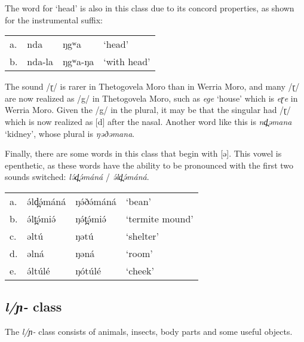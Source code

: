 The word for ‘head’ is also in this class due to its concord properties, as shown for the instrumental suffix:

\ea	
\begin{tabular}[t]{llll}
a.	&	nda		&	ŋgʷa	&	‘head’\\ 
b.	&	nda-la	&	ŋgʷa-ŋa	&	‘with head’\\
\end{tabular}
\z

The sound /ɽ/ is rarer in Thetogovela Moro than in Werria Moro, and many /ɽ/ are now realized as /g/ in Thetogovela Moro, such as \textit{ege} ‘house’ which is \textit{eɽe} in Werria Moro. Given the /g/ in the plural, it may be that the singular had /ɽ/ which is now realized as [d] after the nasal. Another word like this is \textit{nd̪əmana} ‘kidney’, whose plural is \textit{ŋəðəmana}. %

Finally, there are some words in this class that begin with [ə]. This vowel is epenthetic, as these words have the ability to be pronounced with the first two sounds switched: \textit{lə́d̪ə́máná} / \textit{ə́ld̪ə́máná}. 

\ea	
\begin{tabular}[t]{llll}
a.	&	ə́ld̪ə́máná	&	ŋə́ðə́máná	&	‘bean’ \\
b.	&	ə́lt̪ə́miə́	&	ŋə́t̪ə́miə́	&	‘termite mound’\\
c.	&	əltú	&	ŋətú	&	‘shelter’\\
d.	&	əlná	&	ŋəná	&	‘room’\\
e.	&	ə́ltúlé	&	ŋótúlé	&	‘cheek’\\
\end{tabular}
\z

\subsection{\textit{l/ɲ-} class}
The \textit{l/ɲ-} class consists of animals, insects, body parts and some useful objects. 

